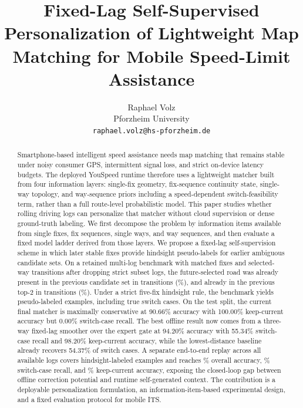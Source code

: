 \documentclass{article}
\title{Fixed-Lag Self-Supervised Personalization of Lightweight Map Matching for Mobile Speed-Limit Assistance}
\author{
  Raphael Volz \\
  Pforzheim University \\
  \texttt{raphael.volz@hs-pforzheim.de}
}
\begin{document}
\maketitle

\begin{abstract}
Smartphone-based intelligent speed assistance needs map matching that remains stable under noisy consumer GPS, intermittent signal loss, and strict on-device latency budgets. The deployed YouSpeed runtime therefore uses a lightweight matcher built from four information layers: single-fix geometry, fix-sequence continuity state, single-way topology, and way-sequence priors including a speed-dependent switch-feasibility term, rather than a full route-level probabilistic model. This paper studies whether rolling driving logs can personalize that matcher without cloud supervision or dense ground-truth labeling. We first decompose the problem by information items available from single fixes, fix sequences, single ways, and way sequences, and then evaluate a fixed model ladder derived from those layers. We propose a fixed-lag self-supervision scheme in which later stable fixes provide hindsight pseudo-labels for earlier ambiguous candidate sets. On a retained multi-log benchmark with \CurrentLogRows{} matched fixes and \CurrentLogTransitions{} selected-way transitions after dropping strict subset logs, the future-selected road was already present in the previous candidate set in \FutureCandidateCount{} transitions (\FutureCandidatePct{}\%), and already in the previous top-2 in \FutureTopTwoCount{} transitions (\FutureTopTwoPct{}\%). Under a strict five-fix hindsight rule, the benchmark yields \PseudoLabelExamples{} pseudo-labeled examples, including \PseudoLabelSwitchCount{} true switch cases. On the test split, the current final matcher is maximally conservative at 90.66\% accuracy with 100.00\% keep-current accuracy but 0.00\% switch-case recall. The best offline result now comes from a three-way fixed-lag smoother over the expert gate at 94.20\% accuracy with 55.34\% switch-case recall and 98.20\% keep-current accuracy, while the lowest-distance baseline already recovers 54.37\% of switch cases. A separate end-to-end replay across all \ReplayAllLogs{} available logs covers \ReplayPseudoExamples{} hindsight-labeled examples and reaches \ReplayAccuracy{}\% overall accuracy, \ReplayChangedRecall{}\% switch-case recall, and \ReplayUnchangedAccuracy{}\% keep-current accuracy, exposing the closed-loop gap between offline correction potential and runtime self-generated context. The contribution is a deployable personalization formulation, an information-item-based experimental design, and a fixed evaluation protocol for mobile ITS.
\end{abstract}
\end{document}
